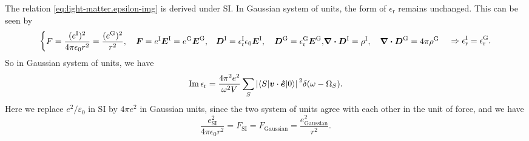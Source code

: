 \documentclass[hyperref, a4paper, 12pt]{report}
\def\\{}%
\newcommand*{\epsr}{\epsilon_{\text{r}}}
\begin{document}
The relation \eqref{eq:light-matter.epsilon-img} is derived under SI. 
In Gaussian system of units, 
the form of $\epsr$ remains unchanged. 
This can be seen by 
\[
    \left\{
        \begin{aligned}
            &F = \frac{(e^{\text{I}})^2}{4 \pi \epsilon_0 r^2} = \frac{(e^{\text{G}})^2}{r^2}, \quad 
            \vb*{F} = e^{\text{I}} \vb*{E}^{\text{I}} 
            = e^{\text{G}} \vb*{E}^{\text{G}}, \\
            &\vb*{D}^{\text{I}} = \epsr^{\text{I}} \epsilon_0 \vb*{E}^{\text{I}}, \quad 
            \vb*{D}^{\text{G}} = \epsr^{\text{G}} \vb*{E}^{\text{G}}, \\
            &\div{\vb*{D}}^{\text{I}} = \rho^{\text{I}}, \quad 
            \div{\vb*{D}}^{\text{G}} = 4\pi \rho^{\text{G}}
        \end{aligned}
    \right. \Rightarrow
    \epsr^{\text{I}} = \epsr^{\text{G}}.
\]
So in Gaussian system of units, 
we have 
\begin{equation}
    \Im \epsr = \frac{4 \pi^2 e^2}{\omega^2  V} 
        \sum_S \abs*{\mel**{S}{\vb*{v} \cdot \vu*{e}}{0}}^2 \delta(\omega - \Omega_S).
    \label{eq:light-matter.epsilon-img-2}
\end{equation}
Here we replace $e^2 / \varepsilon_0$ in SI 
by $4 \pi e^2$ in Gaussian units, 
since the two system of units agree with each other 
in the unit of force, 
and we have 
\[
    \frac{e_{\text{SI}}^2}{4 \pi \epsilon_0 r^2} = F_{\text{SI}}
    = F_{\text{Gaussian}} = \frac{e_{\text{Gaussian}}^2}{r^2}.
\]
\end{document}
